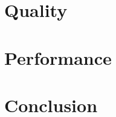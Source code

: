 \documentclass[a4paper,10pt]{article}
\begin{document}
\section{Quality\label{sec:quality}}


\section{Performance\label{sec:performance}}


\section{Conclusion}
	



\end{document}
